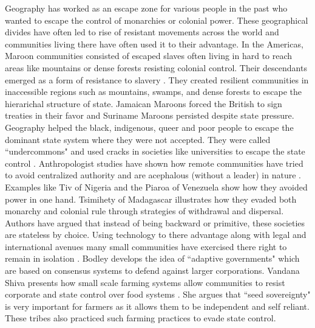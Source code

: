 \begin{sloppypar}
Geography has worked as an escape zone for various people in the past who wanted to escape the control of monarchies or colonial power. These geographical divides have often led to rise of resistant movements across the world and communities living there have often used it to their advantage. In the Americas, Maroon communities consisted of escaped slaves often living in hard to reach areas like mountains or dense forests resisting colonial control. Their descendants emerged as a form of resistance to slavery \citep{price2020rainforest}. They created resilient communities in inaccessible regions such as mountains, swamps, and dense forests to escape the hierarichal structure of state. Jamaican Maroons forced the British to sign treaties in their favor and Suriname Maroons persisted despite state pressure. Geography helped the  black, indigenous, queer and poor people to escape the dominant state system where they were not accepted. They were called ``undercommons" and used cracks in societies like universities to escape the state control \citep{harney2013undercommons}. Anthropologist studies have shown how remote communities have tried to avoid centralized authority and are acephalous (without a leader) in nature \citep{graeber2004fragments}. Examples like Tiv of Nigeria and the Piaroa of Venezuela show how they avoided power in one hand. Tsimihety of Madagascar illustrates how they evaded both monarchy and colonial rule through strategies of withdrawal and dispersal. Authors have argued that instead of being backward or primitive, these societies are stateless by choice. Using technology to there advantage along with legal and international avenues many small communities have exercised there right to remain in isolation \citep{bodley2012anthropology,bodley2014victims}. Bodley develops the idea of ``adaptive governments" which are based on consensus systems to defend against larger corporations. Vandana Shiva presents how small scale farming systems allow communities to resist corporate and state control over food systems \citep{hrynkow2018}. She argues that ``seed sovereignty" is very important for farmers as it allows them to be independent and self reliant. These tribes also practiced such farming practices to evade state control.  


\end{sloppypar}
